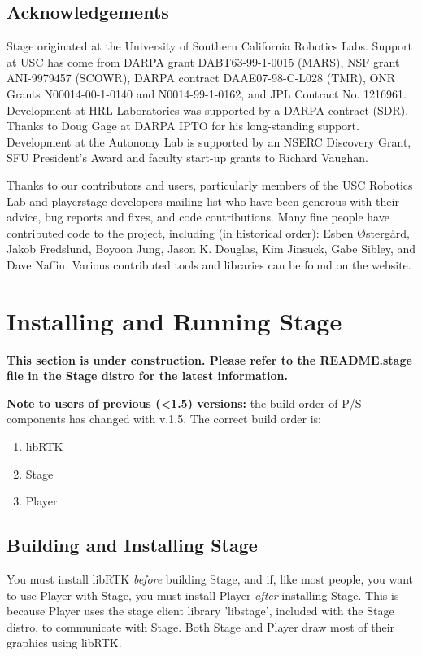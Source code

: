 \documentclass[letter,11pt,twoside]{report}
\begin{document}
\section{Acknowledgements}

Stage originated at the University of Southern California Robotics
Labs. Support at USC has come from DARPA grant DABT63-99-1-0015
(MARS), NSF grant ANI-9979457 (SCOWR), DARPA contract
DAAE07-98-C-L028 (TMR), ONR Grants N00014-00-1-0140 and
N0014-99-1-0162, and JPL Contract No. 1216961. Development at HRL
Laboratories was supported by a DARPA contract (SDR). Thanks to
Doug Gage at DARPA IPTO for his long-standing support. Development
at the Autonomy Lab is supported by an NSERC Discovery Grant, SFU
President's Award and faculty start-up grants to Richard Vaughan.

Thanks to our contributors and users, particularly members of the USC
Robotics Lab and playerstage-developers mailing list who have been
generous with their advice, bug reports and fixes, and code
contributions. Many fine people have contributed code to the project,
including (in historical order): Esben \O{}sterg\aa{}rd, Jakob
Fredslund, Boyoon Jung, Jason K. Douglas, Kim Jinsuck, Gabe Sibley,
and Dave Naffin. Various contributed tools and libraries can be found
on the website.

\chapter{Installing and Running Stage}

{\bf This section is under construction. Please refer to the
  README.stage file in the Stage distro for the latest information.}

{\bf Note to users of previous (<1.5) versions:} the build order of
P/S components has changed with v.1.5. The correct build order is:

\begin{enumerate}
\item libRTK
\item Stage
\item Player
\end{enumerate}

\section{Building and Installing Stage}

You must install libRTK {\em before} building Stage, and if, like
most people, you want to use Player with Stage, you must install
Player {\em after} installing Stage. This is because Player uses the
stage client library 'libstage', included with the Stage distro, to
communicate with Stage. Both Stage and Player draw most of their
graphics using libRTK.
\end{document}
